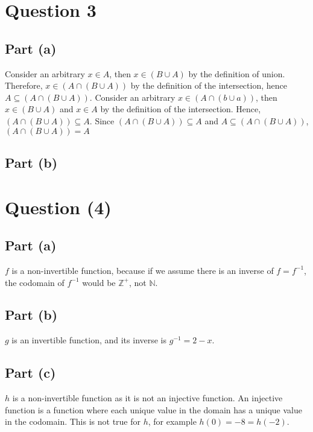 \documentclass[11pt, a4paper]{article}
\begin{document}
\section*{Question 3}
\subsection*{Part (a)}
Consider an arbitrary \(x \in A\), then \(x \in (B \cup A)\) by the definition of union. 
Therefore, \(x \in (A \cap (B \cup A))\) by the definition of the intersection, hence \(A \subseteq (A \cap (B \cup A))\).
Consider an arbitrary \(x \in (A \cap (b \cup a)) \), then \(x \in (B \cup A)\) and \(x \in A\) by the definition of the intersection.
Hence, \((A \cap (B \cup A)) \subseteq A\).
Since \((A \cap (B \cup A)) \subseteq A\) and \(A \subseteq (A \cap (B \cup A))\), \((A \cap (B \cup A)) = A\)

\subsection*{Part (b)}

\section*{Question (4)}
\subsection*{Part (a)}
\(f\) is a non-invertible function, because if we assume there is an inverse of \(f=f^{-1}\), the codomain of \(f^{-1}\) would be \(\mathbb{Z}^{+}\), not \(\mathbb{N}\).

\subsection*{Part (b)}
\(g\) is an invertible function, and its inverse is \(g^{-1}=2-x\).

\subsection*{Part (c)}
\(h\) is a non-invertible function as it is not an injective function.
An injective function is a function where each unique value in the domain has a unique value in the codomain.
This is not true for \(h\), for example \(h(0) = -8 = h(-2)\).
\end{document}
